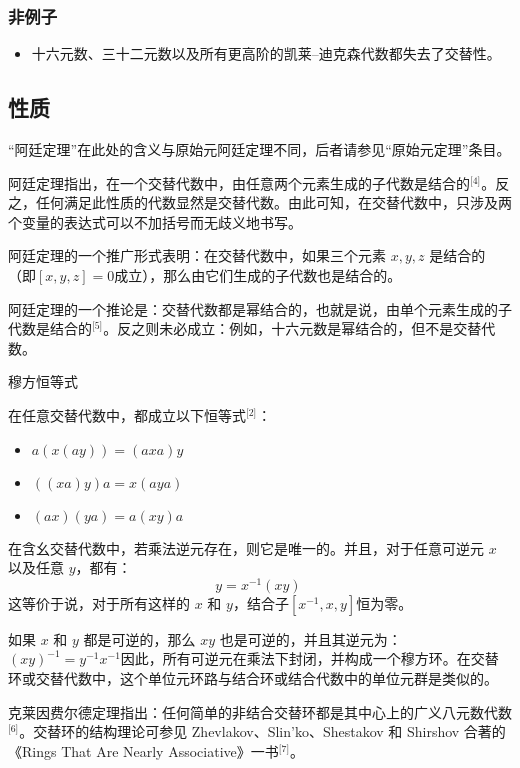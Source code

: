 \subsubsection{非例子}
\begin{itemize}
\item 十六元数、三十二元数以及所有更高阶的凯莱–迪克森代数都失去了交替性。
\end{itemize}
\subsection{性质}
“阿廷定理”在此处的含义与原始元阿廷定理不同，后者请参见“原始元定理”条目。

阿廷定理指出，在一个交替代数中，由任意两个元素生成的子代数是结合的\(^\text{[4]}\)。反之，任何满足此性质的代数显然是交替代数。由此可知，在交替代数中，只涉及两个变量的表达式可以不加括号而无歧义地书写。

阿廷定理的一个推广形式表明：在交替代数中，如果三个元素 $x, y, z$ 是结合的（即$
[x, y, z] = 0$成立），那么由它们生成的子代数也是结合的。

阿廷定理的一个推论是：交替代数都是幂结合的，也就是说，由单个元素生成的子代数是结合的\(^\text{[5]}\)。反之则未必成立：例如，十六元数是幂结合的，但不是交替代数。

穆方恒等式

在任意交替代数中，都成立以下恒等式\(^\text{[2]}\)：
\begin{itemize}
\item $a(x(ay)) = (axa)y$
\item $((xa)y)a = x(aya)$
\item $(ax)(ya) = a(xy)a$
\end{itemize}
在含幺交替代数中，若乘法逆元存在，则它是唯一的。并且，对于任意可逆元 $x$ 以及任意 $y$，都有：
$$
y = x^{-1}(xy)~
$$
这等价于说，对于所有这样的 $x$ 和 $y$，结合子$[x^{-1}, x, y]$恒为零。

如果 $x$ 和 $y$ 都是可逆的，那么 $xy$ 也是可逆的，并且其逆元为：$(xy)^{-1} = y^{-1}x^{-1}$因此，所有可逆元在乘法下封闭，并构成一个穆方环。在交替环或交替代数中，这个单位元环路与结合环或结合代数中的单位元群是类似的。

克莱因费尔德定理指出：任何简单的非结合交替环都是其中心上的广义八元数代数\(^\text{[6]}\)。交替环的结构理论可参见 Zhevlakov、Slin'ko、Shestakov 和 Shirshov 合著的《Rings That Are Nearly Associative》一书\(^\text{[7]}\)。
